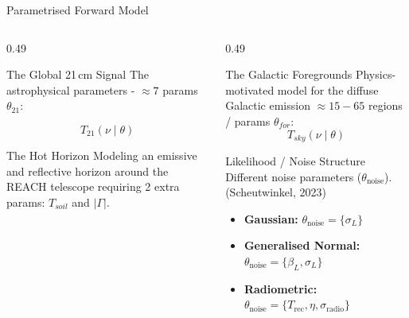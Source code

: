 \documentclass{beamer}
\begin{document}
\begin{frame}{Parametrised Forward Model}

\begin{columns}

\begin{column}{0.49\textwidth}
\vspace{-1.5em}
{

\begin{block}{The Global 21\,cm Signal}
\vspace{0.4em}
\small 
The astrophysical parameters - $\approx 7$ params
\(\theta_{21}\): 

\large
\[
T_{21}(\nu \mid \theta)
\]

\end{block}
}

\begin{block}{The Hot Horizon}
\small 
Modeling an emissive and reflective horizon around the REACH telescope requiring 2 extra params: $T_{soil}$ and $|\Gamma|$.
\vspace{2em}
\end{block}

\end{column}

\begin{column}{0.49\textwidth}
\vspace{-1.55em}
\begin{block}{The Galactic Foregrounds}
\small 
Physics-motivated model for the diffuse Galactic emission $\approx 15 - 65$ regions / params \(\theta_{for}\): 
\large
\vspace{-0.5em}
\[
T_{sky}(\nu \mid \theta)
\]
\vspace{-1.5em}
\end{block}

\begin{block}{Likelihood / Noise Structure}
\small
Different noise parameters
(\(\theta_{\mathrm{noise}}\)).  
{\tiny (Scheutwinkel, 2023)}
\vspace{-0.3em}
\scriptsize

\begin{itemize}
\item \textbf{Gaussian:} \(\theta_{\mathrm{noise}} = \{\sigma_L\}\)

\item \textbf{Generalised Normal:} \(\theta_{\mathrm{noise}} = \{\beta_L, \sigma_L\}\)

\item \textbf{Radiometric:} \(\theta_{\mathrm{noise}} = \{T_{\mathrm{rec}}, \eta, \sigma_{\mathrm{radio}}\}\)
\end{itemize}
\end{block}

\end{column}
\end{columns}
\end{frame}
\end{document}
